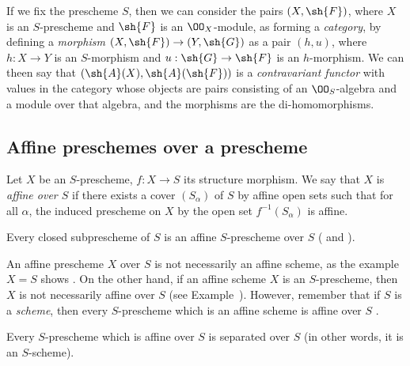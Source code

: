 \begin{env}[1.1.3]
\label{2.1.1.3}
If we fix the prescheme $S$, then we can consider the pairs $(X,\sh{F})$, where $X$ is an $S$-prescheme and $\sh{F}$ is an $\OO_X$-module, as forming a \emph{category}, by defining a \emph{morphism} $(X,\sh{F})\to(Y,\sh{G})$ as a pair $(h,u)$, where $h:X\to Y$ is an $S$-morphism and $u:\sh{G}\to\sh{F}$ is an $h$-morphism.
We can theen say that $(\sh{A}(X),\sh{A}(\sh{F}))$ is a \emph{contravariant functor} with values in the category whose objects are pairs consisting of an $\OO_S$-algebra and a module over that algebra, and the morphisms are the di-homomorphisms.
\end{env}

\subsection{Affine preschemes over a prescheme}
\label{subsection:affine-preschemes-over-a-prescheme}

\begin{defn}[1.2.1]
\label{2.1.2.1}
Let $X$ be an $S$-prescheme, $f:X\to S$ its structure morphism.
We say that $X$ is \emph{affine over $S$} if there exists a cover $(S_\alpha)$ of $S$ by affine open sets such that for all $\alpha$, the induced prescheme on $X$ by the open set $f^{-1}(S_\alpha)$ is affine.
\end{defn}

\begin{exm}[1.2.2]
\label{2.1.2.2}
Every closed subprescheme of $S$ is an affine $S$-prescheme over $S$ ( and ).
\end{exm}

\begin{rmk}[1.2.3]
\label{2.1.2.3}
An affine prescheme $X$ over $S$ is not necessarily an affine scheme, as the example $X=S$ shows .
On the other hand, if an affine scheme $X$ is an $S$-prescheme, then $X$ is not necessarily affine over
$S$ (see Example~).
However, remember that if $S$ is a \emph{scheme}, then every $S$-prescheme which is an affine scheme is affine over $S$ .
\end{rmk}

\begin{prop}[1.2.4]
\label{2.1.2.4}
Every $S$-prescheme which is affine over $S$ is separated over $S$ (in other words, it is an $S$-scheme).
\end{prop}

